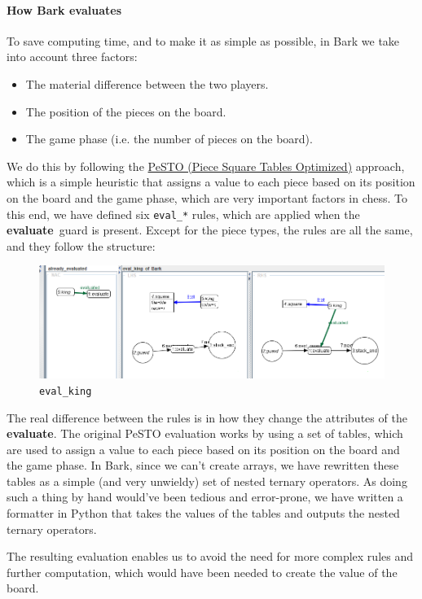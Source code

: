 \documentclass[a4paper, 10pt]{scrartcl}
\newcommand{\noderepr}[1]{\textsf{\textbf{#1}}}
\newcommand{\evaluate}{\noderepr{evaluate}}
\begin{document}
    \paragraph{How Bark evaluates} To save computing time, and to make it as simple as possible, in Bark we take into account three factors:
    \begin{itemize}
        \item The material difference between the two players.
        \item The position of the pieces on the board.
        \item The game phase (i.e. the number of pieces on the board).
    \end{itemize}
    We do this by following the \href{https://www.chessprogramming.org/PeSTO%27s_Evaluation_Function}{PeSTO (Piece Square Tables Optimized)} approach, which is a simple heuristic that assigns a value to each piece based on its position on the board and the game phase, which are very important factors in chess.
    To this end, we have defined six \texttt{eval\_*} rules, which are applied when the \evaluate\ guard is present. Except for the piece types, the rules are all the same, and they follow the structure:
    \begin{figure}[H]
        \centering
        \includegraphics[width=.8\linewidth]{images/eval_king.png}
        \caption{\texttt{eval\_king}}
    \end{figure}
    The real difference between the rules is in how they change the attributes of the \evaluate. The original PeSTO evaluation works by using a set of tables, which are used to assign a value to each piece based on its position on the board and the game phase. In Bark, since we can't create arrays, we have rewritten these tables as a simple (and very unwieldy) set of nested ternary operators. As doing such a thing by hand would've been tedious and error-prone, we have written a formatter in Python that takes the values of the tables and outputs the nested ternary operators.

    The resulting evaluation enables us to avoid the need for more complex rules and further computation, which would have been needed to create the value of the board.
\end{document}
